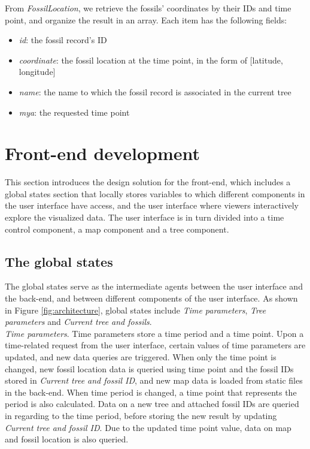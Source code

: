 \documentclass[11pt, a4paper,oneside,chapterprefix=false]{scrbook}
\begin{document}
From \emph{FossilLocation}, we retrieve the fossils' coordinates by their IDs and time point, and organize the result in an array. Each item has the following fields:

\begin{itemize}
	\item \textit{id}: the fossil record's ID
	\item \textit{coordinate}: the fossil location at the time point, in the form of [latitude, longitude]
	\item \textit{name}: the name to which the fossil record is associated in the current tree
	\item \textit{mya}: the requested time point 
\end{itemize}

\section{Front-end development} \label{sec:tec_frontend}
This section introduces the design solution for the front-end, which includes a global states section that locally stores variables to which different components in the user interface have access, and the user interface where viewers interactively explore the visualized data. The user interface is in turn divided into a time control component, a map component and a tree component. 
\subsection{The global states}\label{subsec:tec_frontend_global_states}
The global states serve as the intermediate agents between the user interface and the back-end, and between different components of the user interface. As shown in Figure \ref{fig:architecture}, global states include \emph{Time parameters}, \emph{Tree parameters} and \emph{Current tree and fossils}. \\

\emph{Time parameters}. Time parameters store a time period and a time point. Upon a time-related request from the user interface, certain values of time parameters are updated, and new data queries are triggered. When only the time point is changed, new fossil location data is queried using time point and the fossil IDs stored in \emph{Current tree and fossil ID}, and new map data is loaded from static files in the back-end. When time period is changed, a time point that represents the period is also calculated. Data on a new tree and attached fossil IDs are queried in regarding to the time period, before storing the new result by updating \emph{Current tree and fossil ID}. Due to the updated time point value, data on map and fossil location is also queried. \\
\end{document}
